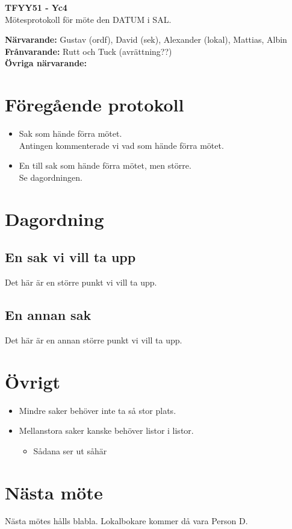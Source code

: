 \documentclass[11pt,a4paper]{article}
\begin{document}
    \begin{center}
        \textbf{\Large TFYY51 - Yc4} \\[0.2em]
        Mötesprotokoll för möte den DATUM i SAL.
    \end{center}
    \vspace{1em}
    \textbf{Närvarande:} Gustav (ordf), David (sek), Alexander (lokal), Mattias, Albin \\[0.5em]
    \textbf{Frånvarande:} Rutt och Tuck (avrättning??) \\[0.5em]  %
    \textbf{Övriga närvarande:}

    \section*{Föregående protokoll}
    \begin{itemize}
        \item Sak som hände förra mötet. \\
        Antingen kommenterade vi vad som hände förra mötet.
        \item En till sak som hände förra mötet, men större. \\
        Se dagordningen.
    \end{itemize}

    \section*{Dagordning}
    \subsection*{En sak vi vill ta upp}
    Det här är en större punkt vi vill ta upp.
    \subsection*{En annan sak}
    Det här är en annan större punkt vi vill ta upp.

    \section*{Övrigt}
    \begin{itemize}
        \item Mindre saker behöver inte ta så stor plats.
        \item Mellanstora saker kanske behöver listor i listor.
        \begin{itemize}
            \item Sådana ser ut såhär
        \end{itemize}
    \end{itemize}

    \section*{Nästa möte}
    Nästa mötes hålls blabla. Lokalbokare kommer då vara Person D.  
\end{document}
